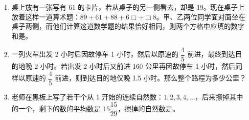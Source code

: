 \documentclass[UTF8,12pt,a4paper]{ctexart}
\newcommand{\BottomWriteSpace}{0.5cm}
\newenvironment{OnePageEightFill}{
  \small
  \vspace*{0pt}
  \begin{enumerate}[leftmargin=*, itemsep=0pt, topsep=0pt, parsep=0pt, partopsep=0pt]
  \setlength{\parskip}{0pt}
}{
  \end{enumerate}
  \vspace*{\BottomWriteSpace}
  \normalsize
  \newpage
}
\newcommand{\Q}[1]{\item #1\par\vfill}
\newcommand{\Qlast}[1]{\item #1\par}
\begin{document}
\begin{OnePageEightFill}
\Q{桌上放有一张写有 61 的卡片，若从桌子的另一侧看去，却是 19。现在桌子上放着这样一道算术题：$89 + 61 + 88 + 6\Box + \Box8$。甲、乙两位同学面对面坐在桌子两侧，而他们计算这道数学题的结果恰好相同，则两个方格中应填的数字和是\underline{\hspace{3em}}。}

\Q{一列火车出发 2 小时后因故停车 1 小时，然后以原速的 $\dfrac{4}{5}$ 前进，最终到达目的地晚 2 小时。若出发 2 小时后又前进 160 公里再因故停车 1 小时，然后同样以原速的 $\dfrac{4}{5}$ 前进，则到达目的地仅晚 1.5 小时。那么整个路程为多少公里？}

\Qlast{老师在黑板上写了若干个从 1 开始的连续自然数：$1, 2, 3, 4, \dots$，后来擦掉其中的一个，剩下的数的平均数是 $15\dfrac{15}{29}$，擦掉的自然数是\underline{\hspace{3em}}。}

\end{OnePageEightFill}
\end{document}
